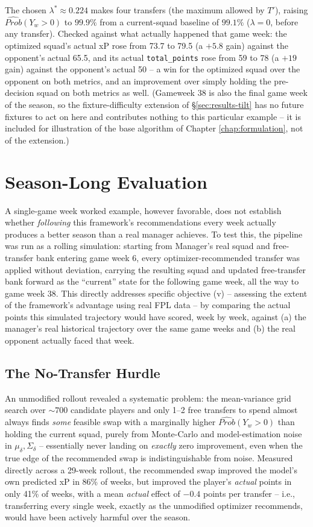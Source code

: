 			The chosen $\lambda^* \approx 0.224$ makes four transfers (the maximum allowed by $T'$), raising $\widehat{Prob}(Y_w>0)$ to $99.9\%$ from a current-squad baseline of $99.1\%$ ($\lambda=0$, before any transfer). Checked against what actually happened that game week: the optimized squad's actual xP rose from 73.7 to 79.5 (a $+5.8$ gain) against the opponent's actual 65.5, and its actual \texttt{total\_points} rose from 59 to 78 (a $+19$ gain) against the opponent's actual 50 -- a win for the optimized squad over the opponent on both metrics, and an improvement over simply holding the pre-decision squad on both metrics as well. (Gameweek 38 is also the final game week of the season, so the fixture-difficulty extension of \S\ref{sec:results-tilt} has no future fixtures to act on here and contributes nothing to this particular example -- it is included for illustration of the base algorithm of Chapter \ref{chap:formulation}, not of the extension.)

		\section{Season-Long Evaluation} \label{sec:results-rolling}
			A single-game week worked example, however favorable, does not establish whether \emph{following} this framework's recommendations every week actually produces a better season than a real manager achieves. To test this, the pipeline was run as a rolling simulation: starting from Manager's real squad and free-transfer bank entering game week 6, every optimizer-recommended transfer was applied without deviation, carrying the resulting squad and updated free-transfer bank forward as the ``current'' state for the following game week, all the way to game week 38. This directly addresses specific objective (v) -- assessing the extent of the framework's advantage using real FPL data -- by comparing the actual points this simulated trajectory would have scored, week by week, against (a) the manager's real historical trajectory over the same game weeks and (b) the real opponent actually faced that week.

			\subsection{The No-Transfer Hurdle}
				An unmodified rollout revealed a systematic problem: the mean-variance grid search over $\sim700$ candidate players and only 1--2 free transfers to spend almost always finds \emph{some} feasible swap with a marginally higher $\widehat{Prob}(Y_w>0)$ than holding the current squad, purely from Monte-Carlo and model-estimation noise in $\mu_\delta, \Sigma_\delta$ -- essentially never landing on \emph{exactly} zero improvement, even when the true edge of the recommended swap is indistinguishable from noise. Measured directly across a 29-week rollout, the recommended swap improved the model's own predicted xP in 86\% of weeks, but improved the player's \emph{actual} points in only 41\% of weeks, with a mean \emph{actual} effect of $-0.4$ points per transfer -- i.e., transferring every single week, exactly as the unmodified optimizer recommends, would have been actively harmful over the season.

